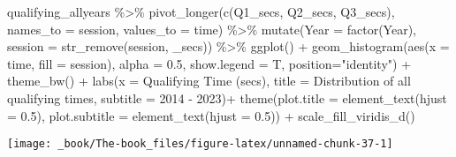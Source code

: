 \documentclass[
]{book}
\newenvironment{Shaded}{\begin{snugshade}}{\end{snugshade}}
\newcommand{\AttributeTok}[1]{\textcolor[rgb]{0.77,0.63,0.00}{#1}}
\newcommand{\FloatTok}[1]{\textcolor[rgb]{0.00,0.00,0.81}{#1}}
\newcommand{\FunctionTok}[1]{\textcolor[rgb]{0.00,0.00,0.00}{#1}}
\newcommand{\NormalTok}[1]{#1}
\newcommand{\SpecialCharTok}[1]{\textcolor[rgb]{0.00,0.00,0.00}{#1}}
\newcommand{\StringTok}[1]{\textcolor[rgb]{0.31,0.60,0.02}{#1}}
\begin{document}
\begin{Shaded}
\begin{Highlighting}[]
\NormalTok{qualifying\_allyears }\SpecialCharTok{\%\textgreater{}\%}
  \FunctionTok{pivot\_longer}\NormalTok{(}\FunctionTok{c}\NormalTok{(}\StringTok{\textquotesingle{}Q1\_secs\textquotesingle{}}\NormalTok{, }\StringTok{\textquotesingle{}Q2\_secs\textquotesingle{}}\NormalTok{, }\StringTok{\textquotesingle{}Q3\_secs\textquotesingle{}}\NormalTok{),}
               \AttributeTok{names\_to =} \StringTok{\textquotesingle{}session\textquotesingle{}}\NormalTok{,}
               \AttributeTok{values\_to =} \StringTok{\textquotesingle{}time\textquotesingle{}}\NormalTok{) }\SpecialCharTok{\%\textgreater{}\%}
  \FunctionTok{mutate}\NormalTok{(}\AttributeTok{Year =} \FunctionTok{factor}\NormalTok{(Year),}
         \AttributeTok{session =} \FunctionTok{str\_remove}\NormalTok{(session, }\StringTok{\textquotesingle{}\_secs\textquotesingle{}}\NormalTok{)) }\SpecialCharTok{\%\textgreater{}\%}
  \FunctionTok{ggplot}\NormalTok{() }\SpecialCharTok{+}
  \FunctionTok{geom\_histogram}\NormalTok{(}\FunctionTok{aes}\NormalTok{(}\AttributeTok{x =}\NormalTok{ time, }\AttributeTok{fill =}\NormalTok{ session),}
                 \AttributeTok{alpha =} \FloatTok{0.5}\NormalTok{, }\AttributeTok{show.legend =}\NormalTok{ T,}
                 \AttributeTok{position=}\StringTok{"identity"}\NormalTok{) }\SpecialCharTok{+}
  \FunctionTok{theme\_bw}\NormalTok{() }\SpecialCharTok{+}
  \FunctionTok{labs}\NormalTok{(}\AttributeTok{x =} \StringTok{\textquotesingle{}Qualifying Time (secs)\textquotesingle{}}\NormalTok{,}
       \AttributeTok{title =} \StringTok{\textquotesingle{}Distribution of all qualifying times\textquotesingle{}}\NormalTok{,}
       \AttributeTok{subtitle =} \StringTok{\textquotesingle{}2014 {-} 2023\textquotesingle{}}\NormalTok{)}\SpecialCharTok{+}
  \FunctionTok{theme}\NormalTok{(}\AttributeTok{plot.title =} \FunctionTok{element\_text}\NormalTok{(}\AttributeTok{hjust =} \FloatTok{0.5}\NormalTok{),}
        \AttributeTok{plot.subtitle =} \FunctionTok{element\_text}\NormalTok{(}\AttributeTok{hjust =} \FloatTok{0.5}\NormalTok{)) }\SpecialCharTok{+}
  \FunctionTok{scale\_fill\_viridis\_d}\NormalTok{()}
\end{Highlighting}
\end{Shaded}

\begin{center}\texttt{[image: \_book/The-book\_files/figure-latex/unnamed-chunk-37-1]} \end{center}
\end{document}
